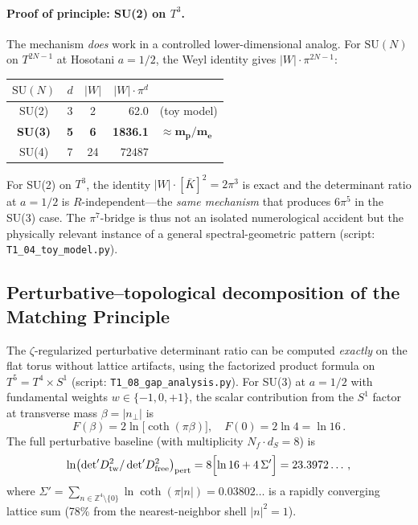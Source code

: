 \documentclass[11pt,a4paper]{article}
\theoremstyle{definition}
\theoremstyle{remark}
\begin{document}
\paragraph{Proof of principle: SU(2) on $T^3$.}
The mechanism \emph{does} work in a controlled lower-dimensional
analog.  For $\mathrm{SU}(N)$ on $T^{2N-1}$ at Hosotani $a\!=\!1/2$,
the Weyl identity gives $|W|\cdot\pi^{2N-1}$:
\begin{center}
\renewcommand{\arraystretch}{1.1}\small
\begin{tabular}{cccrl}
\toprule
$\mathrm{SU}(N)$ & $d$ & $|W|$ & $|W|\cdot\pi^d$ & \\
\midrule
SU(2) & 3 & 2 & 62.0 & (toy model)\\
\textbf{SU(3)} & \textbf{5} & \textbf{6} & \textbf{1836.1}
  & \textbf{$\boldsymbol{\approx m_p/m_e}$}\\
SU(4) & 7 & 24 & 72487 & \\
\bottomrule
\end{tabular}
\end{center}
For SU(2) on $T^3$, the identity $|W|\cdot[\bar K]^2=2\pi^3$ is
exact and the determinant ratio at $a\!=\!1/2$ is $R$-independent---the
\emph{same mechanism} that produces $6\pi^5$ in the SU(3) case.
The $\pi^7$-bridge is thus not an isolated numerological accident
but the physically relevant instance of a general spectral-geometric
pattern (script: \texttt{T1\_04\_toy\_model.py}).

\subsection{Perturbative--topological decomposition of the Matching Principle}
\label{sec:decomposition}

The $\zeta$-regularized perturbative determinant ratio can be computed
\emph{exactly} on the flat torus without lattice artifacts, using the
factorized product formula on $T^5=T^4\times S^1$
(script: \texttt{T1\_08\_gap\_analysis.py}).  For SU(3) at $a\!=\!1/2$ with
fundamental weights $w\in\{-1,0,+1\}$, the scalar contribution
from the $S^1$ factor at transverse mass $\beta=|n_\perp|$ is
\begin{equation}\label{eq:Fmode}
  F(\beta)=2\ln\!\bigl[\coth(\pi\beta)\bigr],
  \quad
  F(0)=2\ln 4=\ln 16\,.
\end{equation}
The full perturbative baseline (with multiplicity $N_f\cdot d_S=8$) is
\begin{equation}\label{eq:pertbaseline}
  \ln\bigl(\det\nolimits'\!D^2_{\mathrm{tw}}
    /\det\nolimits'\!D^2_{\mathrm{free}}\bigr)_{\mathrm{pert}}
  = 8\Bigl[\ln 16 + 4\,\Sigma'\Bigr]
  = 23.3972\ldots\,,
\end{equation}
where $\Sigma'=\sum_{n\in\mathbb{Z}^4\setminus\{0\}}\ln\coth(\pi|n|)
=0.03802\ldots$ is a rapidly converging lattice sum (78\% from the
nearest-neighbor shell $|n|^2\!=\!1$).
\end{document}
